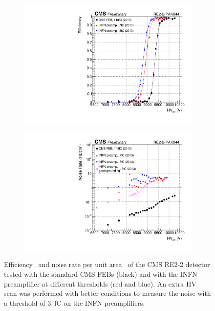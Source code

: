 	\begin{figure}[H]
		\begin{subfigure}{.5\linewidth}
		    \centering
			\includegraphics[width=\linewidth]{fig/chapt6/INFN-Preamplifier-Shift.pdf}
			\caption{\label{fig:INFN-preamp-res:A}}
		\end{subfigure}
		\begin{subfigure}{.5\linewidth}
		    \centering
			\includegraphics[width = \linewidth]{fig/chapt6/INFN-Preamplifier-Rate-Shift.pdf}
			\caption{\label{fig:INFN-preamp-res:B}}
		\end{subfigure}
		\caption{\label{fig:INFN-preamp-res} Efficiency~ and noise rate per unit area~ of the CMS RE2-2 detector tested with the standard CMS FEBs (black) and with the INFN preamplifier at different thresholds (red and blue). An extra HV scan was performed with better conditions to measure the noise with a threshold of \SI{3}{fC} on the INFN preamplifiers.}
	\end{figure}
	
